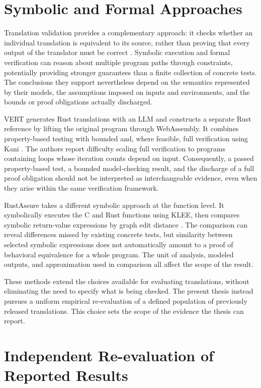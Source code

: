 \section{Symbolic and Formal Approaches}
\label{sec:rw-formal}

Translation validation provides a complementary approach: it checks
whether an individual translation is equivalent to its source, rather
than proving that every output of the translator must be correct
\cite{pnueli1998tv,necula2000tv}. Symbolic execution and formal
verification can reason about multiple program paths through
constraints, potentially providing stronger guarantees than a finite
collection of concrete tests. The conclusions they support nevertheless
depend on the semantics represented by their models, the assumptions
imposed on inputs and environments, and the bounds or proof obligations
actually discharged.

VERT generates Rust translations with an LLM and constructs a separate
Rust reference by lifting the original program through WebAssembly. It
combines property-based testing with bounded and, where feasible, full
verification using Kani \cite{yang2024vert}. The authors report
difficulty scaling full verification to programs containing loops whose
iteration counts depend on input. Consequently, a passed property-based
test, a bounded model-checking result, and the discharge of a full proof
obligation should not be interpreted as interchangeable evidence, even
when they arise within the same verification framework.

RustAssure takes a different symbolic approach at the function level. It
symbolically executes the C and Rust functions using KLEE, then compares
symbolic return-value expressions by graph edit distance
\cite{bai2025rustassure}. The comparison can reveal differences missed
by existing concrete tests, but similarity between selected symbolic
expressions does not automatically amount to a proof of behavioral
equivalence for a whole program. The unit of analysis, modeled outputs,
and approximation used in comparison all affect the scope of the result.

These methods extend the choices available for evaluating translations,
without eliminating the need to specify what is being checked. The
present thesis instead pursues a uniform empirical re-evaluation of a
defined population of previously released translations. This choice sets the scope of the evidence the thesis can report.

\section{Independent Re-evaluation of Reported Results}
\label{sec:rw-reevaluation}\label{sec:rw-threats}

